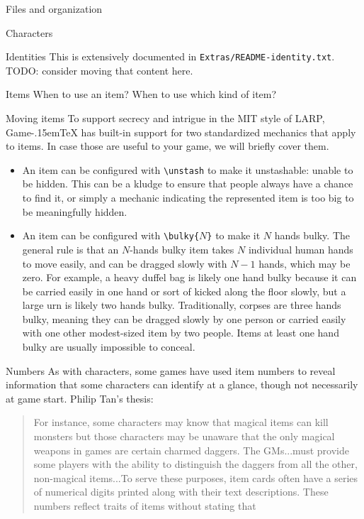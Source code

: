 \documentclass[11pt]{article}
\def\gametex{\mbox{Game\kern-.15em\TeX}}
\begin{document}
\begin{section}{Files and organization}
\begin{subsection}{Characters}
\begin{subsubsection}{Identities}
This is extensively documented in \lstinline|Extras/README-identity.txt|.  TODO: consider moving that content here.
\end{subsubsection}
\end{subsection}
\begin{subsection}{Items}
When to use an item?  When to use which kind of item?

\begin{subsubsection}{Moving items}
To support secrecy and intrigue in the MIT style of LARP, \gametex{} has built-in support for two standardized mechanics that apply to items.  In case those are useful to your game, we will briefly cover them.
\begin{itemize}
\item An item can be configured with \lstinline|\unstash| to make it unstashable: unable to be hidden.  This can be a kludge to ensure that people always have a chance to find it, or simply a mechanic indicating the represented item is too big to be meaningfully hidden.
\item An item can be configured with \texttt{\textbackslash{}bulky\{$N$\}} to make it $N$ hands bulky.  The general rule is that an $N$-hands bulky item takes $N$ individual human hands to move easily, and can be dragged slowly with $N-1$ hands, which may be zero.  For example, a heavy duffel bag is likely one hand bulky because it can be carried easily in one hand or sort of kicked along the floor slowly, but a large urn is likely two hands bulky.  Traditionally, corpses are three hands bulky, meaning they can be dragged slowly by one person or carried easily with one other modest-sized item by two people.  Items at least one hand bulky are usually impossible to conceal.
\end{itemize}
\end{subsubsection}
\begin{subsubsection}{Numbers}
As with characters, some games have used item numbers to reveal information that some characters can identify at a glance, though not necessarily at game start.  Philip Tan's thesis:
\begin{quote}
For instance, some characters may know that magical items can kill monsters but those
characters may be unaware that the only magical weapons in games are certain charmed
daggers. The GMs...must provide some players with the
ability to distinguish the daggers from all the other, non-magical items...To serve these purposes, item cards often have a series of numerical digits printed along
with their text descriptions. These numbers reflect traits of items without stating that

\end{quote}
\end{subsubsection}
\end{subsection}
\end{section}
\end{document}
